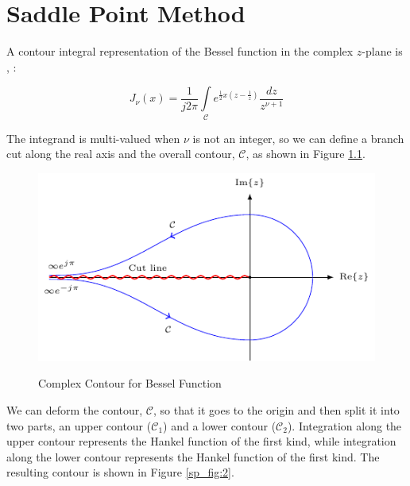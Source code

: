 \chapter{Saddle Point Method}
A contour integral representation of the Bessel function in the complex $z$-plane is \cite{arfken_weber}, \cite{nist_handbook}:

\begin{equation}
  J_{\nu}(x) = \frac{1}{j2\pi}\int\limits_{\mathcal{C}}e^{\frac{1}{2}x\left(z- \frac{1}{z} \right)} \frac{dz}{z^{\nu+1}}
  \label{sp_eq:1}
\end{equation}
\renewcommand{\baselinestretch}{2} \small\normalsize

The integrand is multi-valued when $\nu$ is not an integer, so we can define a branch cut along the real axis and the overall contour, $\mathcal{C}$, as shown in Figure \ref{sp_fig:1}.

\begin{figure}[H]
  \begin{center}
\includegraphics[width=5in]{../media/hankel_contours-figure0.pdf}
  \end{center}
  \renewcommand{\baselinestretch}{1} \small\normalsize
  \begin{quote}
    \caption[Complex Contour for Bessel Function]{ Complex Contour for Bessel Function\label{sp_fig:1}}
  \end{quote}
\end{figure}
\renewcommand{\baselinestretch}{2} \small\normalsize

We can deform the contour, $\mathcal{C}$, so that it goes to the origin and then split it into two parts, an upper contour ($\mathcal{C}_1$) and a lower contour ($\mathcal{C}_2$). Integration along the upper contour represents the Hankel function of the first kind, while integration along the lower contour represents the Hankel function of the first kind. The resulting contour is shown in Figure \ref{sp_fig:2}.

